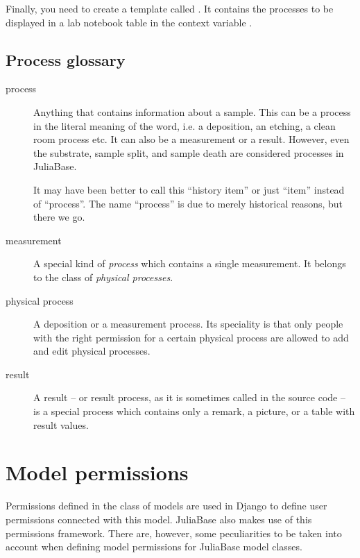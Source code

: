 \documentclass[a4paper,11pt,english]{sphinxmanual}
\begin{document}
Finally, you need to create a template called
.  It contains the processes to be
displayed in a lab notebook table in the context variable .


\section{Process glossary}
\label{programming/programming:process-glossary}\begin{description}
\item[{process}] \leavevmode{}\label{programming/programming:term-process}
Anything that contains information about a sample.  This can be a process
in the literal meaning of the word, i.e. a deposition, an etching, a
clean room process etc.  It can also be a measurement or a result.
However, even the substrate, sample split, and sample death are
considered processes in JuliaBase.

It may have been better to call this “history item” or just “item”
instead of “process”.  The name “process” is due to merely historical
reasons, but there we go.

\item[{measurement}] \leavevmode{}\label{programming/programming:term-measurement}
A special kind of \emph{process} which contains a single measurement.  It
belongs to the class of \emph{physical processes}.

\item[{physical process}] \leavevmode{}\label{programming/programming:term-physical-process}
A deposition or a measurement process.  Its speciality is that only
people with the right permission for a certain physical process are
allowed to add and edit physical processes.

\item[{result}] \leavevmode{}\label{programming/programming:term-result}
A result – or result process, as it is sometimes called in the source
code – is a special process which contains only a remark, a picture, or a
table with result values.

\end{description}


\chapter{Model permissions}
\label{programming/permissions:index-0}\label{programming/permissions::doc}\label{programming/permissions:model-permissions}
Permissions defined in the  class of models are used in Django to
define user permissions connected with this model.  JuliaBase also makes use of
this permissions framework.  There are, however, some peculiarities to be taken
into account when defining model permissions for JuliaBase model classes.
\end{document}
